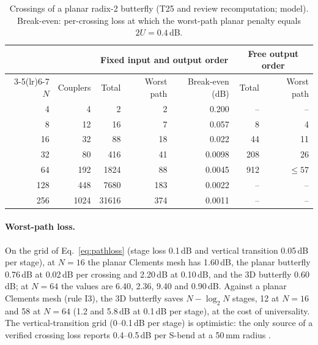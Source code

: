 \documentclass[11pt,a4paper]{article}
\newcommand{\dB}{\,dB\xspace}
\begin{document}
\begin{table}[t]
\centering\small
\caption{Crossings of a planar radix-2 butterfly (T25 and review recomputation; model). Break-even: per-crossing loss at which the worst-path planar penalty equals $2U=0.4$\dB.}
\label{tab:crossings}
\begin{tabular}{@{}rrrrrrr@{}}
\toprule
 & & \multicolumn{3}{c}{Fixed input and output order} & \multicolumn{2}{c}{Free output order} \\
\cmidrule(lr){3-5}\cmidrule(lr){6-7}
$N$ & Couplers & Total & Worst path & Break-even (dB) & Total & Worst path \\
\midrule
4 & 4 & 2 & 2 & 0.200 & -- & -- \\
8 & 12 & 16 & 7 & 0.057 & 8 & 4 \\
16 & 32 & 88 & 18 & 0.022 & 44 & 11 \\
32 & 80 & 416 & 41 & 0.0098 & 208 & 26 \\
64 & 192 & 1824 & 88 & 0.0045 & 912 & $\le57$ \\
128 & 448 & 7680 & 183 & 0.0022 & -- & -- \\
256 & 1024 & 31616 & 374 & 0.0011 & -- & -- \\
\bottomrule
\end{tabular}
\end{table}

\paragraph{Worst-path loss.} On the grid of Eq.~\eqref{eq:pathloss} (stage loss 0.1\dB and vertical transition 0.05\dB per stage), at $N=16$ the planar Clements mesh has 1.60\dB, the planar butterfly 0.76\dB at 0.02\dB per crossing and 2.20\dB at 0.10\dB, and the 3D butterfly 0.60\dB; at $N=64$ the values are 6.40, 2.36, 9.40 and 0.90\dB. Against a planar Clements mesh (rule I3), the 3D butterfly saves $N-\log_2N$ stages, 12 at $N=16$ and 58 at $N=64$ (1.2 and 5.8\dB at 0.1\dB per stage), at the cost of universality. The vertical-transition grid (0--0.1\dB per stage) is optimistic: the only source of a verified crossing loss reports 0.4--0.5\dB per S-bend at a 50\,mm radius \cite{Djogo2026}.
\end{document}
